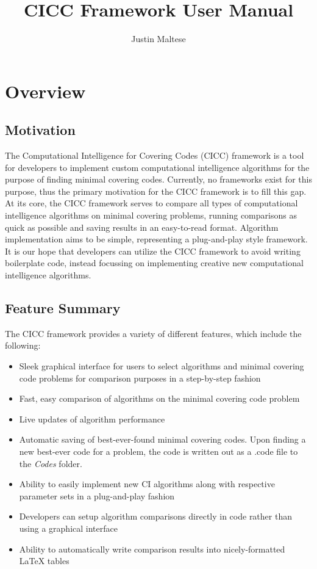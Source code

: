 \documentclass[titlepage]{article}
\begin{document}
\doublespacing
\author{Justin Maltese}
\title{CICC Framework User Manual}
\maketitle
\def\code#1{\texttt{#1}}


\tableofcontents

\section{Overview}
\subsection{Motivation}

The Computational Intelligence for Covering Codes (CICC) framework is a tool for developers to implement custom computational intelligence algorithms for the purpose of finding minimal covering codes. Currently, no frameworks exist for this purpose, thus the primary motivation for the CICC framework is to fill this gap. At its core, the CICC framework serves to compare all types of computational intelligence algorithms on minimal covering problems, running comparisons as quick as possible and saving results in an easy-to-read format. Algorithm implementation aims to be simple, representing a plug-and-play style framework. It is our hope that developers can utilize the CICC framework to avoid writing boilerplate code, instead focussing on implementing creative new computational intelligence algorithms.
\subsection{Feature Summary}

The CICC framework provides a variety of different features, which include the following:

\begin{itemize}
\item Sleek graphical interface for users to select algorithms and minimal covering code problems for comparison purposes in a step-by-step fashion
\item Fast, easy comparison of algorithms on the minimal covering code problem
\item Live updates of algorithm performance
\item Automatic saving of best-ever-found minimal covering codes. Upon finding a new best-ever code for a problem, the code is written out as a .code file to the \textit{Codes} folder.
\item Ability to easily implement new CI algorithms along with respective parameter sets in a plug-and-play fashion
\item Developers can setup algorithm comparisons directly in code rather than using a graphical interface
\item Ability to automatically write comparison results into nicely-formatted LaTeX tables
\end{itemize}
\end{document}
